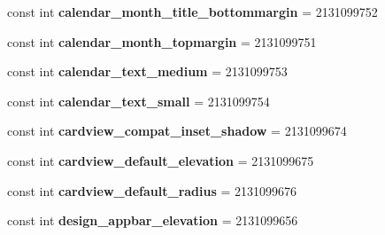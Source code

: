 \begin{DoxyCompactItemize}
\item 
\hypertarget{classClient_1_1Droid_1_1Resource_1_1Dimension_aee95c8f533f80396d263078f23f8a6b2}{}const int {\bfseries calendar\+\_\+month\+\_\+title\+\_\+bottommargin} = 2131099752\label{classClient_1_1Droid_1_1Resource_1_1Dimension_aee95c8f533f80396d263078f23f8a6b2}

\item 
\hypertarget{classClient_1_1Droid_1_1Resource_1_1Dimension_a4e6142cedf30f15da478a11996ac5c8a}{}const int {\bfseries calendar\+\_\+month\+\_\+topmargin} = 2131099751\label{classClient_1_1Droid_1_1Resource_1_1Dimension_a4e6142cedf30f15da478a11996ac5c8a}

\item 
\hypertarget{classClient_1_1Droid_1_1Resource_1_1Dimension_a131e6e174c4fd4d18f2f143e5ea3dce7}{}const int {\bfseries calendar\+\_\+text\+\_\+medium} = 2131099753\label{classClient_1_1Droid_1_1Resource_1_1Dimension_a131e6e174c4fd4d18f2f143e5ea3dce7}

\item 
\hypertarget{classClient_1_1Droid_1_1Resource_1_1Dimension_a127cc8d60e04283f6de7ae5ccc6d3dfe}{}const int {\bfseries calendar\+\_\+text\+\_\+small} = 2131099754\label{classClient_1_1Droid_1_1Resource_1_1Dimension_a127cc8d60e04283f6de7ae5ccc6d3dfe}

\item 
\hypertarget{classClient_1_1Droid_1_1Resource_1_1Dimension_a8b4fc8dd1e62c5bef8bae192cdfc1561}{}const int {\bfseries cardview\+\_\+compat\+\_\+inset\+\_\+shadow} = 2131099674\label{classClient_1_1Droid_1_1Resource_1_1Dimension_a8b4fc8dd1e62c5bef8bae192cdfc1561}

\item 
\hypertarget{classClient_1_1Droid_1_1Resource_1_1Dimension_aa7a1a39d106bb7f873a56e53b6ad084e}{}const int {\bfseries cardview\+\_\+default\+\_\+elevation} = 2131099675\label{classClient_1_1Droid_1_1Resource_1_1Dimension_aa7a1a39d106bb7f873a56e53b6ad084e}

\item 
\hypertarget{classClient_1_1Droid_1_1Resource_1_1Dimension_a63382b5ad236daa8346f5ef57e45fcb8}{}const int {\bfseries cardview\+\_\+default\+\_\+radius} = 2131099676\label{classClient_1_1Droid_1_1Resource_1_1Dimension_a63382b5ad236daa8346f5ef57e45fcb8}

\item 
\hypertarget{classClient_1_1Droid_1_1Resource_1_1Dimension_a574365cc5ecabf038a3e4d2ef00a83db}{}const int {\bfseries design\+\_\+appbar\+\_\+elevation} = 2131099656\label{classClient_1_1Droid_1_1Resource_1_1Dimension_a574365cc5ecabf038a3e4d2ef00a83db}


\end{DoxyCompactItemize}
